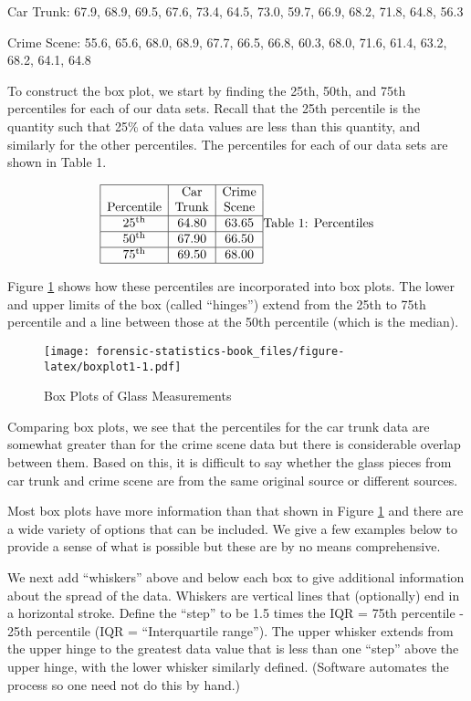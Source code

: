 \documentclass[
]{book}
\begin{document}
Car Trunk: 67.9, 68.9, 69.5, 67.6, 73.4, 64.5, 73.0, 59.7, 66.9, 68.2, 71.8, 64.8, 56.3

Crime Scene: 55.6, 65.6, 68.0, 68.9, 67.7, 66.5, 66.8, 60.3, 68.0, 71.6, 61.4, 63.2, 68.2, 64.1, 64.8

To construct the box plot, we start by finding the 25th, 50th, and 75th percentiles
for each of our data sets. Recall that the 25th percentile is the quantity such
that 25\% of the data values are less than this quantity, and similarly for the
other percentiles. The percentiles for each of our data sets are shown in
Table 1.

\[
\begin{array}{|c|c|c|} \hline
& \mathrm{Car} & \text{Crime}  \\
\text{Percentile} & \mathrm{Trunk} & \text{Scene}  \\ \hline
25^{\text{th}} & 64.80 & 63.65  \\  \hline
50^{\text{th}}  & 67.90 & 66.50  \\  \hline
75^{\text{th}} & 69.50 & 68.00  \\  \hline
\end{array}\\
\mbox{Table 1: Percentiles}
\]

Figure \ref{fig:boxplot1} shows how these percentiles
are incorporated into box plots. The lower and upper
limits of the box (called ``hinges'') extend from the
25th to 75th percentile and a line between those at the 50th percentile
(which is the median).

\begin{figure}
\centering
\texttt{[image: forensic-statistics-book\_files/figure-latex/boxplot1-1.pdf]}
\caption{\label{fig:boxplot1}Box Plots of Glass Measurements}
\end{figure}

Comparing box plots, we see that the percentiles for the car trunk data
are somewhat greater than for the crime scene data but there is considerable
overlap between them. Based on this, it is difficult to say whether the
glass pieces from car trunk and crime scene are from the same
original source or different sources.

Most box plots have more information than that shown in Figure \ref{fig:boxplot1}
and there are a wide variety of options that can be included. We give a few
examples below to provide a sense of what is possible but these are by no means
comprehensive.

We next add ``whiskers'' above and below each box to give additional information
about the spread of the data. Whiskers are vertical lines that (optionally)
end in a horizontal stroke. Define the ``step'' to be 1.5 times the
IQR = 75th percentile - 25th percentile (IQR = ``Interquartile range'').
The upper whisker extends
from the upper hinge to the greatest data value that is less than one ``step''
above the upper hinge, with the lower whisker similarly defined. (Software
automates the process so one need not do this by hand.)
\end{document}
